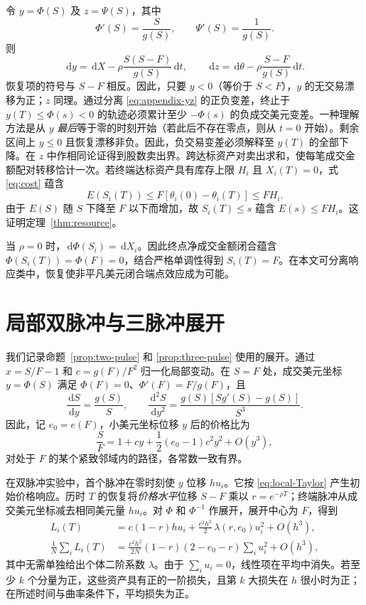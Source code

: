 \documentclass[11pt]{article}
\numberwithin{equation}{section}
\theoremstyle{definition}
\theoremstyle{remark}
\newcommand{\dd}{\,\mathrm{d}}
\begin{document}
令 $y=\Phi(S)$ 及 $z=\Psi(S)$，其中
\[
\Phi'(S)=\frac{S}{g(S)},\qquad \Psi'(S)=\frac1{g(S)}.
\]
则
\begin{equation}\label{eq:appendix-yz}
\dd y=\dd X-\rho\frac{S(S-F)}{g(S)}\dd t,
\qquad
\dd z=\dd\theta-\rho\frac{S-F}{g(S)}\dd t.
\end{equation}
恢复项的符号与 $S-F$ 相反。因此，只要 $y<0$（等价于 $S<F$），$y$ 的无交易漂移为正；$z$ 同理。通过分离 \eqref{eq:appendix-yz} 的正负变差，终止于 $y(T)\le\Phi(s)<0$ 的轨迹必须累计至少 $-\Phi(s)$ 的负成交美元变差。一种理解方法是从 $y$ \emph{最后}等于零的时刻开始（若此后不存在零点，则从 $t=0$ 开始）。剩余区间上 $y\le0$ 且恢复漂移非负。因此，负交易变差必须解释至 $y(T)$ 的全部下降。在 $z$ 中作相同论证得到股数卖出界。跨达标资产对卖出求和，使每笔成交金额配对转移恰计一次。若终端达标资产具有库存上限 $H_i$ 且 $X_i(T)=0$，式 \eqref{eq:cost} 蕴含
\[
E(S_i(T))\le F\left[\theta_i(0)-\theta_i(T)\right]\le FH_i.
\]
由于 $E(S)$ 随 $S$ 下降至 $F$ 以下而增加，故 $S_i(T)\le s$ 蕴含 $E(s)\le FH_i$。这证明定理~\ref{thm:resource}。

当 $\rho=0$ 时，$\dd\Phi(S_i)=\dd X_i$。因此终点净成交金额闭合蕴含 $\Phi(S_i(T))=\Phi(F)=0$，结合严格单调性得到 $S_i(T)=F$。在本文可分离响应类中，恢复使非平凡美元闭合端点效应成为可能。

\section{局部双脉冲与三脉冲展开}\label{app:local}
我们记录命题~\ref{prop:two-pulse} 和 \ref{prop:three-pulse} 使用的展开。通过 $x=S/F-1$ 和 $c=g(F)/F^2$ 归一化局部变动。在 $S=F$ 处，成交美元坐标 $y=\Phi(S)$ 满足 $\Phi(F)=0$、$\Phi'(F)=F/g(F)$，且
\begin{equation}\label{eq:local-inverse}
\frac{\dd S}{\dd y}=\frac{g(S)}S,
\qquad
\frac{\dd^2 S}{\dd y^2}=
\frac{g(S)[Sg'(S)-g(S)]}{S^3}.
\end{equation}
因此，记 $e_0=e(F)$，小美元坐标位移 $y$ 后的价格比为
\begin{equation}\label{eq:local-Taylor}
\frac SF=1+cy+\frac12(e_0-1)c^2y^2+O(y^3),
\end{equation}
对处于 $F$ 的某个紧致邻域内的路径，各常数一致有界。

在双脉冲实验中，首个脉冲在零时刻使 $y$ 位移 $hu_i$。它按 \eqref{eq:local-Taylor} 产生初始价格响应。历时 $T$ 的恢复将\emph{价格水平}位移 $S-F$ 乘以 $r=e^{-\rho T}$；终端脉冲从成交美元坐标减去相同美元量 $hu_i$。对 $\Phi$ 和 $\Phi^{-1}$ 作展开，展开中心为 $F$，得到
\begin{align}\label{eq:local-two}
L_i(T)&=c(1-r)hu_i+\frac{c^2h^2}{2}\,\lambda(r,e_0)u_i^2+O(h^3),\\
\frac1N\sum_i L_i(T)&=\frac{c^2h^2}{2N}(1-r)(2-e_0-r)\sum_i u_i^2+O(h^3),\nonumber
\end{align}
其中无需单独给出个体二阶系数 $\lambda$。由于 $\sum_i u_i=0$，线性项在平均中消失。若至少 $k$ 个分量为正，这些资产具有正的一阶损失，且第 $k$ 大损失在 $h$ 很小时为正；在所述时间与曲率条件下，平均损失为正。
\end{document}
